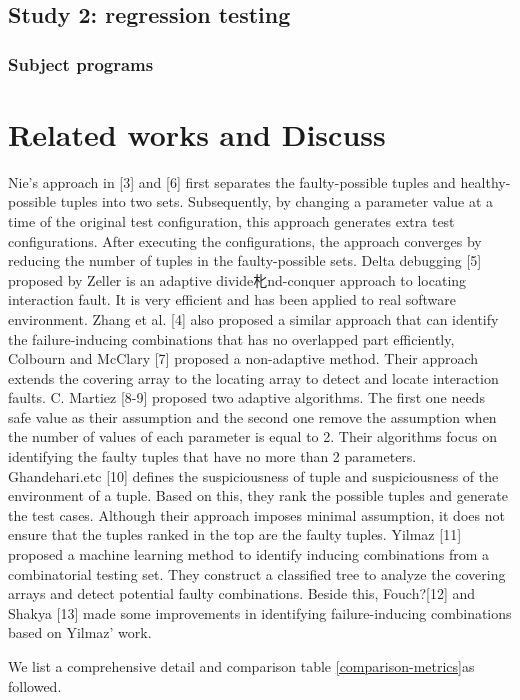 \documentclass[10pt,journal,cspaper,compsoc]{IEEEtran}
\begin{document}
\subsection{Study 2: regression testing}
\subsubsection{Subject programs}

\section{Related works and Discuss}
Nie's approach in [3] and [6] first separates the faulty-possible tuples and healthy-possible tuples into two sets. Subsequently, by changing a parameter value at a time of the original test configuration, this approach generates extra test configurations. After executing the configurations, the approach converges by reducing the number of tuples in the faulty-possible sets.
Delta debugging [5] proposed by Zeller is an adaptive divide朼nd-conquer approach to locating interaction fault. It is very efficient and has been applied to real software environment. Zhang et al. [4] also proposed a similar approach that can identify the failure-inducing combinations that has no overlapped part efficiently,
Colbourn and McClary [7] proposed a non-adaptive method. Their approach extends the covering array to the locating array to detect and locate interaction faults.
C. Martiez [8-9] proposed two adaptive algorithms. The first one needs safe value as their assumption and the second one remove the assumption when the number of values of each parameter is equal to 2. Their algorithms focus on identifying the faulty tuples that have no more than 2 parameters.
Ghandehari.etc [10] defines the suspiciousness of tuple and suspiciousness of the environment of a tuple. Based on this, they rank the possible tuples and generate the test cases. Although their approach imposes minimal assumption, it does not ensure that the tuples ranked in the top are the faulty tuples.
Yilmaz [11] proposed a machine learning method to identify inducing combinations from a combinatorial testing set. They construct a classified tree to analyze the covering arrays and detect potential faulty combinations. Beside this, Fouch?[12] and Shakya [13] made some improvements in identifying failure-inducing combinations based on Yilmaz' work.

We list a comprehensive detail and comparison table \ref{comparison-metrics}as followed.
\end{document}
